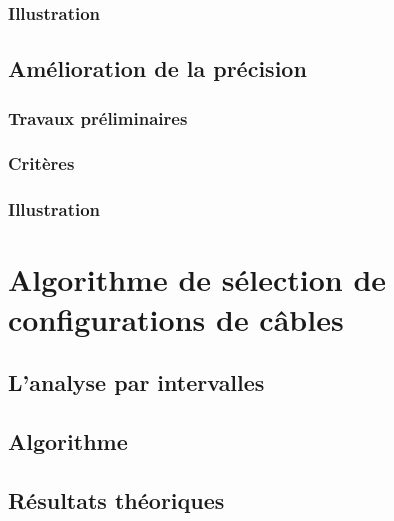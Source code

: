 \subsubsection{Illustration}

\subsection{Am\'elioration de la pr\'ecision}

\subsubsection{Travaux pr\'eliminaires}

\subsubsection{Crit\`eres}

\subsubsection{Illustration}

\section{Algorithme de s\'election de configurations de c\^ables}

\cite{ramadour2014}


\subsection{L'analyse par intervalles}

\subsection{Algorithme}

\subsection{R\'esultats th\'eoriques}

